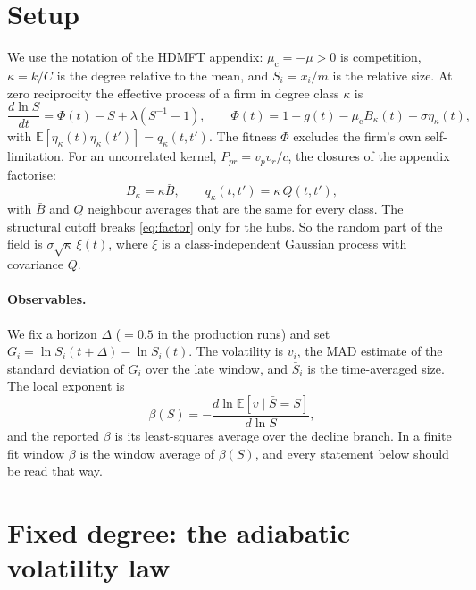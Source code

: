 \documentclass[11pt]{article}
\newcommand{\E}{\mathbb E}
\newcommand{\mc}{\mu_{\mathrm c}}
\theoremstyle{remark}
\begin{document}
\section{Setup}

We use the notation of the HDMFT appendix: $\mc=-\mu>0$ is competition,
$\kappa=k/C$ is the degree relative to the mean, and $S_i=x_i/m$ is the relative size.  At
zero reciprocity the effective process of a firm in degree class $\kappa$ is
\begin{equation}
  \frac{d\ln S}{dt}=\Phi(t)-S+\lambda\left(S^{-1}-1\right),
  \qquad
  \Phi(t)=1-g(t)-\mc B_\kappa(t)+\sigma\eta_\kappa(t),
  \label{eq:process}
\end{equation}
with $\E[\eta_\kappa(t)\eta_\kappa(t')]=q_\kappa(t,t')$.  The fitness $\Phi$ excludes the
firm's own self-limitation.  For an uncorrelated kernel, $P_{pr}=v_pv_r/c$, the closures of the
appendix factorise:
\begin{equation}
  B_\kappa=\kappa\bar B,\qquad q_\kappa(t,t')=\kappa\,Q(t,t'),
  \label{eq:factor}
\end{equation}
with $\bar B$ and $Q$ neighbour averages that are the same for every class.  The structural
cutoff breaks \eqref{eq:factor} only for the hubs.  So the random part of the field is
$\sigma\sqrt\kappa\,\xi(t)$, where $\xi$ is a class-independent Gaussian process with covariance
$Q$.

\paragraph{Observables.}
We fix a horizon $\Delta$ ($=0.5$ in the production runs) and set $G_i=\ln S_i(t+\Delta)-\ln
S_i(t)$.  The volatility is $v_i$, the MAD estimate of the standard deviation of $G_i$ over the
late window, and $\bar S_i$ is the time-averaged size.  The local exponent is
\begin{equation}
  \beta(S)=-\frac{d\ln\E[v\mid\bar S=S]}{d\ln S},
\end{equation}
and the reported $\beta$ is its least-squares average over the decline branch.  In a finite fit
window $\beta$ is the window average of $\beta(S)$, and every statement below should be read
that way.

\section{Fixed degree: the adiabatic volatility law}
\end{document}
